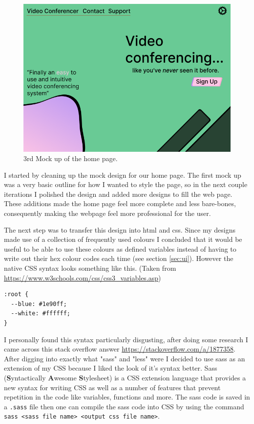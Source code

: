 \begin{figure}[H]
\centering

\includegraphics[scale=0.2]{Images/HomeUI_3.png}

\caption{3rd Mock up of the home page.}
\label{fig:ui3}
\end{figure}

I started by cleaning up the mock design for our home page.
The first mock up was a very basic outline for how I wanted to 
style the page, so in the next couple iterations I polished 
the design and added more designs to fill the web page. These
additions made the home page feel more complete and less 
bare-bones, consequently making the webpage feel more 
professional for the user. \\ \vspace{0.2cm}

The next step was to transfer this design into html and css. 
Since my designs made use of a collection of frequently used 
colours I concluded that it would be useful to be able to use
these colours as defined variables instead of having to write 
out their hex colour codes each time 
(see section \ref{sec:ui}). However the native CSS syntax 
looks something like this. (Taken from \url{https://www.w3schools.com/css/css3_variables.asp})

\begin{verbatim}
:root {
  --blue: #1e90ff;
  --white: #ffffff;
}
\end{verbatim}

I personally found this syntax particularly disgusting, 
after doing some research I came across this stack overflow 
answer \url{https://stackoverflow.com/a/1877358}. After digging
into exactly what "sass" and "less" were I decided to use sass
as an extension of my CSS because I liked the look of it's 
syntax better. Sass (\textbf{S}yntactically \textbf{A}wesome 
\textbf{S}tylesheet) is a CSS extension language that 
provides a new syntax for writing CSS as well as a number of 
features that prevent repetition in the code like variables, 
functions and more. The sass code is saved in a \texttt{.sass}
file then one can compile the sass code into CSS by using the
command \texttt{sass <sass file name> <output css file name>}.
\\ \vspace{0.2cm}


